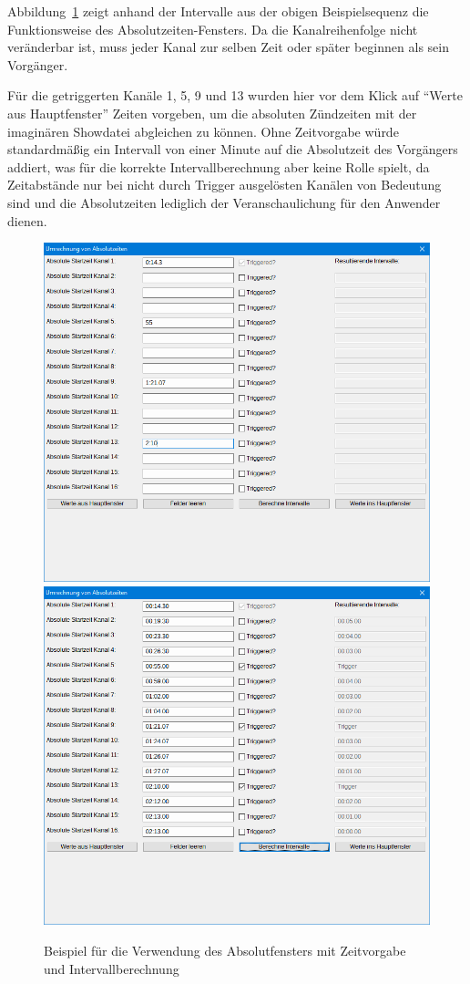 \documentclass[paper=a4, open=any]{scrbook}
\begin{document}
				Abbildung~\ref{fig:beispielabsolut} zeigt anhand der Intervalle aus der obigen Beispielsequenz die Funktionsweise des Absolut\-zeiten-Fensters. Da die Kanalreihenfolge nicht veränderbar ist, muss jeder Kanal zur selben Zeit oder später beginnen als sein Vorgänger.
				
				Für die getriggerten Kanäle 1, 5, 9 und 13 wurden hier vor dem Klick auf \enquote{Werte aus Hauptfenster} Zeiten vorgeben, um die absoluten Zündzeiten mit der imaginären Showdatei abgleichen zu können. Ohne Zeitvorgabe würde standardmäßig ein Intervall von einer Minute auf die Absolutzeit des Vorgängers addiert, was für die korrekte Intervallberechnung aber keine Rolle spielt, da Zeitabstände nur bei nicht durch Trigger ausgelösten Kanälen von Bedeutung sind und die Absolutzeiten lediglich der Veranschaulichung für den Anwender dienen.
				
				\begin{figure}[tb]
					\begin{center}\includegraphics[width=.8\textwidth]{beispielzeitvorgabe}{\\}\includegraphics[width=.8\textwidth]{beispielabsolut}\end{center}
					\caption{Beispiel für die Verwendung des Absolutfensters mit Zeitvorgabe und Intervallberechnung}
					\label{fig:beispielabsolut}
				\end{figure}
			
\end{document}
